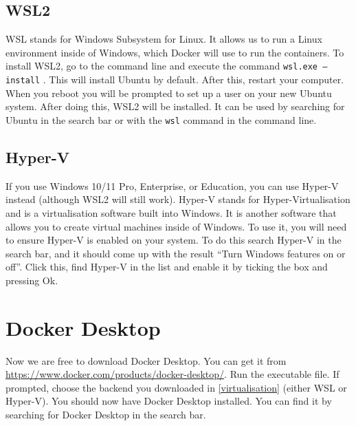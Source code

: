 \documentclass[11pt]{article}
\def\code#1{\texttt{#1}}
\begin{document}
\subsection{WSL2}
WSL stands for Windows Subsystem for Linux. It allows us to run a Linux environment inside of Windows, which Docker will use to run the containers. To install WSL2, go to the command line and execute the command \code{wsl.exe --install} \cite{omgubuntu}. This will install Ubuntu by default. After this, restart your computer. When you reboot you will be prompted to set up a user on your new Ubuntu system. After doing this, WSL2 will be installed. It can be used by searching for Ubuntu in the search bar or with the \code{wsl} command in the command line.

\subsection{Hyper-V}
If you use Windows 10/11 Pro, Enterprise, or Education, you can use Hyper-V instead (although WSL2 will still work). Hyper-V stands for Hyper-Virtualisation and is a virtualisation software built into Windows. It is another software that allows you to create virtual machines inside of Windows. To use it, you will need to ensure Hyper-V is enabled on your system. To do this search Hyper-V in the search bar, and it should come up with the result ``Turn Windows features on or off''. Click this, find Hyper-V in the list and enable it by ticking the box and pressing Ok. \cite{hyperv}

\section{Docker Desktop}
Now we are free to download Docker Desktop. You can get it from \url{https://www.docker.com/products/docker-desktop/}. Run the executable file. If prompted, choose the backend you downloaded in \ref{virtualisation} (either WSL or Hyper-V). You should now have Docker Desktop installed. You can find it by searching for Docker Desktop in the search bar.

\pagebreak
\end{document}

